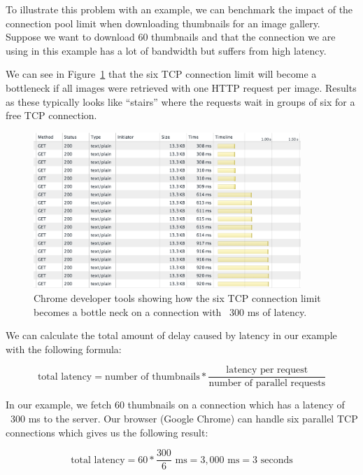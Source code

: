 \documentclass{cslthse-msc}
\begin{document}
To illustrate this problem with an example, we can benchmark the impact of the connection pool limit when downloading thumbnails for an image gallery. Suppose we want to download 60 thumbnails and that the connection we are using in this example has a lot of bandwidth but suffers from high latency.

We can see in Figure~\ref{fig:tcp_bottleneck} that the six TCP connection limit will become a bottleneck if all images were retrieved with one HTTP request per image. Results as these typically looks like \enquote{stairs} where the requests wait in groups of six for a free TCP connection.

\begin{figure}[H]
  \centering
    \begin{center}
      \includegraphics[width=0.9\textwidth]{images/chrome_latency_limit.png}
    \end{center}
  \caption{Chrome developer tools showing how the six TCP connection limit becomes a bottle neck on a connection with ~300 ms of latency.}
  \label{fig:tcp_bottleneck}
\end{figure}

We can calculate the total amount of delay caused by latency in our example with the following formula:

\begin{equation}
\mbox{total latency} = \mbox{number of thumbnails} * \frac{\mbox{latency per request}}{\mbox{number of parallel requests}}
\end{equation}

In our example, we fetch 60 thumbnails on a connection which has a latency of ~300 ms to the server. Our browser (Google Chrome) can handle six parallel TCP connections which gives us the following result:

\begin{equation}
\mbox{total latency} = 60 * \frac{300}{6} \mbox{ ms}= 3,000 \mbox{ ms} = 3 \mbox{ seconds}
\end{equation}
\end{document}

